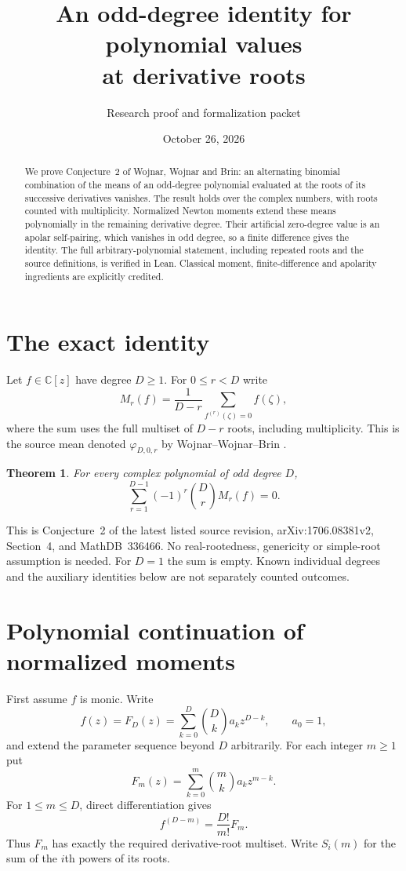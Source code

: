 \documentclass[11pt]{article}
\title{An odd-degree identity for polynomial values\\at derivative roots}
\author{Research proof and formalization packet}
\date{October 26, 2026}
\newtheorem{theorem}{Theorem}
\begin{document}
\maketitle
\begin{abstract}
We prove Conjecture~2 of Wojnar, Wojnar and Brin: an alternating binomial
combination of the means of an odd-degree polynomial evaluated at the
roots of its successive derivatives vanishes. The result holds over the
complex numbers, with roots counted with multiplicity. Normalized Newton
moments extend these means polynomially in the remaining derivative
degree. Their artificial zero-degree value is an apolar self-pairing,
which vanishes in odd degree, so a finite difference gives the identity.
The full arbitrary-polynomial statement, including repeated roots and
the source definitions, is verified in Lean. Classical moment,
finite-difference and apolarity ingredients are explicitly credited.
\end{abstract}

\section{The exact identity}
Let $f\in\mathbb C[z]$ have degree $D\geq1$. For $0\leq r<D$ write
\[
 M_r(f)=\frac{1}{D-r}\sum_{f^{(r)}(\zeta)=0}f(\zeta),
\]
where the sum uses the full multiset of $D-r$ roots, including
multiplicity. This is the source mean denoted $\varphi_{D,0,r}$ by
Wojnar--Wojnar--Brin \cite{WWB}.

\begin{theorem}\label{thm:main}
For every complex polynomial of odd degree $D$,
\begin{equation}\label{eq:main}
 \sum_{r=1}^{D-1}(-1)^r\binom Dr M_r(f)=0.
\end{equation}
\end{theorem}

This is Conjecture~2 of the latest listed source revision,
arXiv:1706.08381v2, Section~4, and MathDB~336466. No real-rootedness,
genericity or simple-root assumption is needed. For $D=1$ the sum is
empty. Known individual degrees and the auxiliary identities below are
not separately counted outcomes.

\section{Polynomial continuation of normalized moments}
First assume $f$ is monic. Write
\[
 f(z)=F_D(z)=\sum_{k=0}^D\binom Dk a_k z^{D-k},\qquad a_0=1,
\]
and extend the parameter sequence beyond $D$ arbitrarily. For each
integer $m\geq1$ put
\[
 F_m(z)=\sum_{k=0}^m\binom mk a_k z^{m-k}.
\]
For $1\leq m\leq D$, direct differentiation gives
\begin{equation}\label{eq:appell}
 f^{(D-m)}=\frac{D!}{m!}F_m.
\end{equation}
Thus $F_m$ has exactly the required derivative-root multiset. Write
$S_i(m)$ for the sum of the $i$th powers of its roots.
\end{document}
